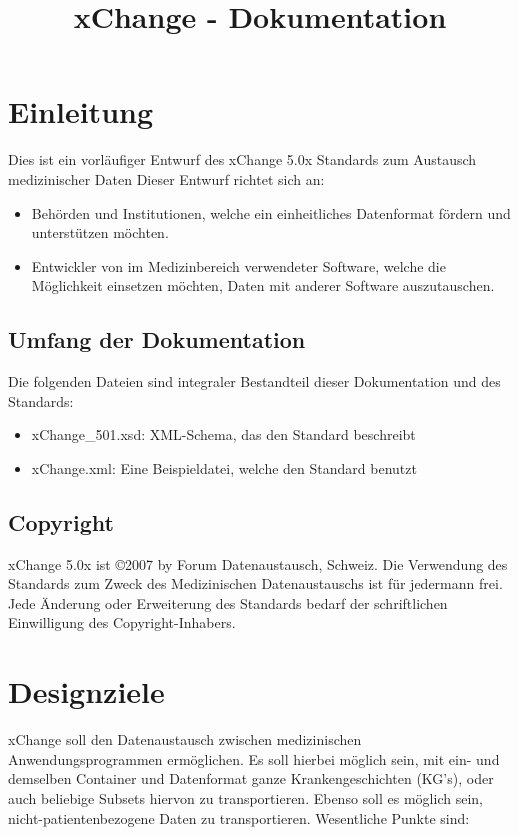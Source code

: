 \documentclass[a4paper]{scrartcl}
\begin{document}
\title{xChange - Dokumentation}
\maketitle
\section{Einleitung}
Dies ist ein vorläufiger Entwurf des xChange 5.0x Standards zum Austausch medizinischer Daten
Dieser Entwurf richtet sich an:
\begin{itemize}
    \item Behörden und Institutionen, welche ein einheitliches Datenformat fördern und unterstützen möchten.
    \item Entwickler von im Medizinbereich verwendeter Software, welche die Möglichkeit einsetzen möchten, Daten mit anderer Software auszutauschen.
\end{itemize}

\subsection{Umfang der Dokumentation}
Die folgenden Dateien sind integraler Bestandteil dieser Dokumentation und des Standards:
\begin{itemize}
    \item xChange\_501.xsd: XML-Schema, das den Standard beschreibt
    \item xChange.xml: Eine Beispieldatei, welche den Standard benutzt
\end{itemize}

\subsection{Copyright}
xChange 5.0x ist \copyright 2007 by Forum Datenaustausch, Schweiz. Die Verwendung des Standards zum Zweck des Medizinischen Datenaustauschs ist für jedermann frei.
Jede Änderung oder Erweiterung des Standards bedarf der schriftlichen Einwilligung des Copyright-Inhabers.

\section{Designziele}
xChange soll den Datenaustausch zwischen medizinischen Anwendungsprogrammen ermöglichen. Es soll hierbei möglich sein, mit ein- und demselben Container und Datenformat ganze Krankengeschichten (KG's), oder auch beliebige Subsets hiervon zu transportieren. Ebenso soll es möglich sein, nicht-patientenbezogene Daten zu transportieren. Wesentliche Punkte sind:
\end{document}
